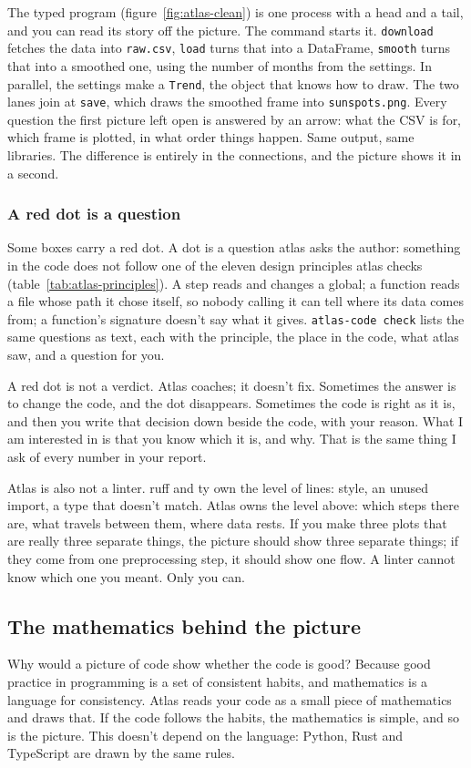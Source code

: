 \documentclass[12pt, a4paper]{article}
\theoremstyle{definition}
\theoremstyle{remark}
\begin{document}
The typed program (figure~\ref{fig:atlas-clean}) is one process with a head and a tail, and you can read its story off the picture. The command starts it. \texttt{download} fetches the data into \texttt{raw.csv}, \texttt{load} turns that into a DataFrame, \texttt{smooth} turns that into a smoothed one, using the number of months from the settings. In parallel, the settings make a \texttt{Trend}, the object that knows how to draw. The two lanes join at \texttt{save}, which draws the smoothed frame into \texttt{sunspots.png}. Every question the first picture left open is answered by an arrow: what the CSV is for, which frame is plotted, in what order things happen. Same output, same libraries. The difference is entirely in the connections, and the picture shows it in a second.

\subsubsection{A red dot is a question}
Some boxes carry a red dot. A dot is a question atlas asks the author: something in the code does not follow one of the eleven design principles atlas checks (table~\ref{tab:atlas-principles}). A step reads and changes a global; a function reads a file whose path it chose itself, so nobody calling it can tell where its data comes from; a function's signature doesn't say what it gives. \texttt{atlas-code check} lists the same questions as text, each with the principle, the place in the code, what atlas saw, and a question for you.

A red dot is not a verdict. Atlas coaches; it doesn't fix. Sometimes the answer is to change the code, and the dot disappears. Sometimes the code is right as it is, and then you write that decision down beside the code, with your reason. What I am interested in is that you know which it is, and why. That is the same thing I ask of every number in your report.

Atlas is also not a linter. ruff and ty own the level of lines: style, an unused import, a type that doesn't match. Atlas owns the level above: which steps there are, what travels between them, where data rests. If you make three plots that are really three separate things, the picture should show three separate things; if they come from one preprocessing step, it should show one flow. A linter cannot know which one you meant. Only you can.

\subsection{The mathematics behind the picture}
\label{sec:atlas-math}
Why would a picture of code show whether the code is good? Because good practice in programming is a set of consistent habits, and mathematics is a language for consistency. Atlas reads your code as a small piece of mathematics and draws that. If the code follows the habits, the mathematics is simple, and so is the picture. This doesn't depend on the language: Python, Rust and TypeScript are drawn by the same rules.
\end{document}
